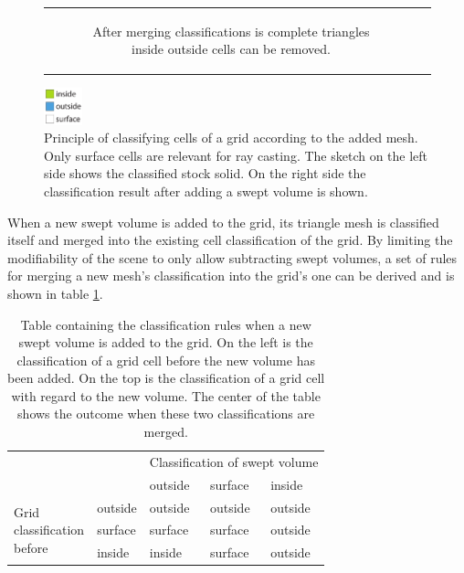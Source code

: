 \begin{figure}[h]
\begin{tabular}{cc}
\begin{subfigure}[t]{0.3\textwidth}
			\caption{After merging classifications is complete triangles inside outside cells can be removed.}
			\label{fig:classification_after_removal}
		\end{subfigure}\\
	\end{tabular}
	\includegraphics[width=0.1\textwidth]{images/classification_legend}
	\caption{Principle of classifying cells of a grid according to the added mesh. Only surface cells are relevant for ray casting. The sketch on the left side shows the classified stock solid. On the right side the classification result after adding a swept volume is shown.}
	\label{fig:classification}
\end{figure}

When a new swept volume is added to the grid, its triangle mesh is classified itself and merged into the existing cell classification of the grid.
By limiting the modifiability of the scene to only allow subtracting swept volumes, a set of rules for merging a new mesh's classification into the grid's one can be derived and is shown in table \ref{tbl:classification_rules}.

\begin{table}[h]
	\centering
	\begin{tabular}{p{2cm}p{2cm}|p{2cm}p{2cm}p{2cm}}
		&         & \multicolumn{3}{l}{Classification of swept volume} \\
		&         & outside           & surface           & inside            \\ \hline
		\multirow{3}{*}{\parbox{2cm}{Grid \\ classification \\ before}} & outside & outside           & outside           & outside           \\
		& surface & surface           & surface           & outside           \\
		& inside  & inside            & surface           & outside          
	\end{tabular}
	\caption{
		Table containing the classification rules when a new swept volume is added to the grid.
		On the left is the classification of a grid cell before the new volume has been added.
		On the top is the classification of a grid cell with regard to the new volume.
		The center of the table shows the outcome when these two classifications are merged.
	}
	\label{tbl:classification_rules}
\end{table}

